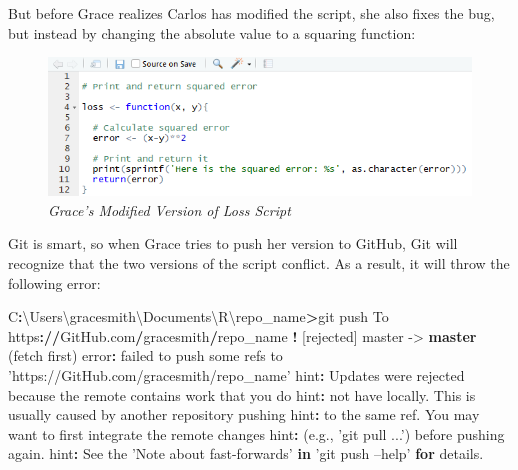\documentclass[]{book}
\newenvironment{Shaded}{\begin{snugshade}}{\end{snugshade}}
\newcommand{\KeywordTok}[1]{\textcolor[rgb]{0.13,0.29,0.53}{\textbf{#1}}}
\newcommand{\StringTok}[1]{\textcolor[rgb]{0.31,0.60,0.02}{#1}}
\newcommand{\ControlFlowTok}[1]{\textcolor[rgb]{0.13,0.29,0.53}{\textbf{#1}}}
\newcommand{\OperatorTok}[1]{\textcolor[rgb]{0.81,0.36,0.00}{\textbf{#1}}}
\newcommand{\ErrorTok}[1]{\textcolor[rgb]{0.64,0.00,0.00}{\textbf{#1}}}
\newcommand{\NormalTok}[1]{#1}
\begin{document}
But before Grace realizes Carlos has modified the script, she also fixes
the bug, but instead by changing the absolute value to a squaring
function:

\begin{figure}
\centering
\includegraphics{images/lossGrace.PNG}
\caption{\emph{Grace's Modified Version of Loss Script}}
\end{figure}

Git is smart, so when Grace tries to push her version to GitHub, Git
will recognize that the two versions of the script conflict. As a
result, it will throw the following error:

\begin{Shaded}
\begin{Highlighting}[]
\NormalTok{C}\OperatorTok{:}\NormalTok{\textbackslash{}Users\textbackslash{}gracesmith\textbackslash{}Documents\textbackslash{}R\textbackslash{}repo_name}\OperatorTok{>}\NormalTok{git push}
\NormalTok{To https}\OperatorTok{:}\ErrorTok{//}\NormalTok{GitHub.com}\OperatorTok{/}\NormalTok{gracesmith}\OperatorTok{/}\NormalTok{repo_name}
 \OperatorTok{!}\StringTok{ }\NormalTok{[rejected]        master ->}\StringTok{ }\KeywordTok{master}\NormalTok{ (fetch first)}
\NormalTok{error}\OperatorTok{:}\StringTok{ }\NormalTok{failed to push some refs to }\StringTok{'https://GitHub.com/gracesmith/repo_name'}
\NormalTok{hint}\OperatorTok{:}\StringTok{ }\NormalTok{Updates were rejected because the remote contains work that you do}
\NormalTok{hint}\OperatorTok{:}\StringTok{ }\NormalTok{not have locally. This is usually caused by another repository pushing}
\NormalTok{hint}\OperatorTok{:}\StringTok{ }\NormalTok{to the same ref. You may want to first integrate the remote changes}
\NormalTok{hint}\OperatorTok{:}\StringTok{ }\NormalTok{(e.g., }\StringTok{'git pull ...'}\NormalTok{) before pushing again.}
\NormalTok{hint}\OperatorTok{:}\StringTok{ }\NormalTok{See the }\StringTok{'Note about fast-forwards'} \ControlFlowTok{in} \StringTok{'git push --help'} \ControlFlowTok{for}\NormalTok{ details.}
\end{Highlighting}
\end{Shaded}
\end{document}
